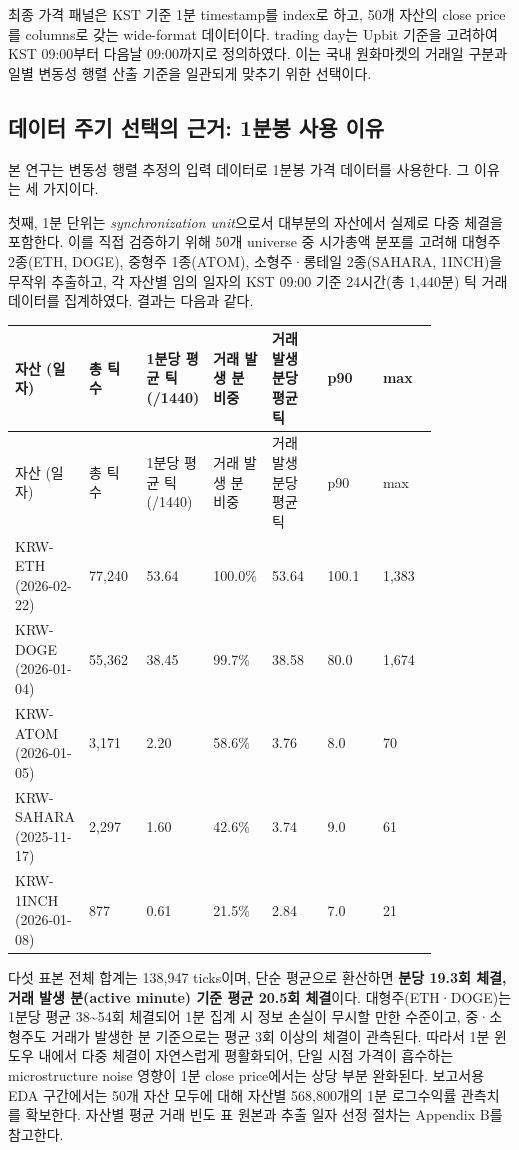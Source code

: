 \documentclass[12pt,a4paper]{article}
\begin{document}

최종 가격 패널은 KST 기준 1분 timestamp를 index로 하고, 50개 자산의 close price를 columns로 갖는 wide-format 데이터이다. trading day는 Upbit 기준을 고려하여 KST 09:00부터 다음날 09:00까지로 정의하였다. 이는 국내 원화마켓의 거래일 구분과 일별 변동성 행렬 산출 기준을 일관되게 맞추기 위한 선택이다.

\subsection{데이터 주기 선택의 근거: 1분봉 사용 이유}

본 연구는 변동성 행렬 추정의 입력 데이터로 1분봉 가격 데이터를 사용한다. 그 이유는 세 가지이다.

첫째, 1분 단위는 \emph{synchronization unit}으로서 대부분의 자산에서 실제로 다중 체결을 포함한다. 이를 직접 검증하기 위해 50개 universe 중 시가총액 분포를 고려해 대형주 2종(ETH, DOGE), 중형주 1종(ATOM), 소형주·롱테일 2종(SAHARA, 1INCH)을 무작위 추출하고, 각 자산별 임의 일자의 KST 09:00 기준 24시간(총 1,440분) 틱 거래 데이터를 집계하였다. 결과는 다음과 같다.

\begin{center}
\scriptsize
\begin{longtable}{@{}lp{0.14\linewidth}p{0.14\linewidth}p{0.14\linewidth}p{0.14\linewidth}p{0.14\linewidth}p{0.14\linewidth}@{}}
\toprule
자산 (일자) & 총 틱 수 & 1분당 평균 틱 (/1440) & 거래 발생 분 비중 & 거래 발생 분당 평균 틱 & p90 & max \\
\midrule
\endfirsthead
\toprule
자산 (일자) & 총 틱 수 & 1분당 평균 틱 (/1440) & 거래 발생 분 비중 & 거래 발생 분당 평균 틱 & p90 & max \\
\midrule
\endhead
KRW-ETH (2026-02-22) & 77,240 & 53.64 & 100.0\% & 53.64 & 100.1 & 1,383 \\
KRW-DOGE (2026-01-04) & 55,362 & 38.45 & 99.7\% & 38.58 & 80.0 & 1,674 \\
KRW-ATOM (2026-01-05) & 3,171 & 2.20 & 58.6\% & 3.76 & 8.0 & 70 \\
KRW-SAHARA (2025-11-17) & 2,297 & 1.60 & 42.6\% & 3.74 & 9.0 & 61 \\
KRW-1INCH (2026-01-08) & 877 & 0.61 & 21.5\% & 2.84 & 7.0 & 21 \\
\bottomrule
\end{longtable}
\end{center}

다섯 표본 전체 합계는 138,947 ticks이며, 단순 평균으로 환산하면 \textbf{분당 19.3회 체결, 거래 발생 분(active minute) 기준 평균 20.5회 체결}이다. 대형주(ETH·DOGE)는 1분당 평균 38\textasciitilde{}54회 체결되어 1분 집계 시 정보 손실이 무시할 만한 수준이고, 중·소형주도 거래가 발생한 분 기준으로는 평균 3회 이상의 체결이 관측된다. 따라서 1분 윈도우 내에서 다중 체결이 자연스럽게 평활화되어, 단일 시점 가격이 흡수하는 microstructure noise 영향이 1분 close price에서는 상당 부분 완화된다. 보고서용 EDA 구간에서는 50개 자산 모두에 대해 자산별 568,800개의 1분 로그수익률 관측치를 확보한다. 자산별 평균 거래 빈도 표 원본과 추출 일자 선정 절차는 Appendix B를 참고한다.
\end{document}
